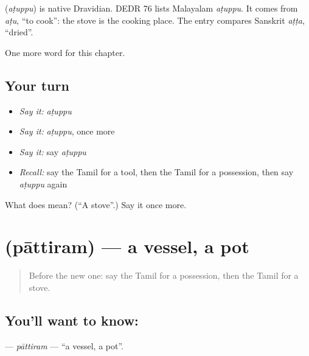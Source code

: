 \begin{cousinweb}
\textbf{} (\emph{aṭuppu}) is native Dravidian. DEDR 76 lists Malayalam \emph{aṭuppu}. It comes from \emph{aṭu}, \textquotedblleft{}to cook\textquotedblright{}: the stove is the cooking place. The entry compares Sanskrit \emph{aṭṭa}, \textquotedblleft{}dried\textquotedblright{}.
\end{cousinweb}

\begin{grammarlens}[title={What you've built}]
One more word for this chapter.
\end{grammarlens}

\subsection*{Your turn}
\begin{itemize}
\raggedright
  \item \emph{Say it:} \emph{aṭuppu}
  \item \emph{Say it:} \emph{aṭuppu}, once more
  \item \emph{Say it:} say \emph{aṭuppu}
  \item \emph{Recall:} say the Tamil for a tool, then the Tamil for a possession, then say \emph{aṭuppu} again
\end{itemize}

\begin{tcolorbox}[breakable,colback=teal!4,colframe=teal!35!black,title={Before you move on}]
What does  mean? (\textquotedblleft{}A stove\textquotedblright{}.) Say it once more.
\end{tcolorbox}
\section[\texorpdfstring{\ta{பாத்திரம்} (pāttiram)}{பாத்திரம் (pāttiram)}]{ (pāttiram) — a vessel, a pot}

\label{lesson:TA-C118-pattiram}



\begin{quote}
Before the new one: say the Tamil for a possession, then the Tamil for a stove.
\end{quote}

\subsection*{You'll want to know: }
\textbf{} — \emph{pāttiram} — \textquotedblleft{}a vessel, a pot\textquotedblright{}.

